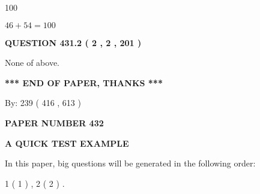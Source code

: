 \documentclass[12pt]{article}
\begin{document}
100
 
 
 
 
\noindent{}

$ %
46 +  %
54=   %
100$
 
 
  
\vspace{0.2in}
  
{\textbf{\Large{QUESTION
431.2 
 ( 2 , 2 , 201 )
}}}
  
  
 
 
\noindent{}
 
 
 None of above.
 
 
 
 
   
   
 \vspace{0.2in}
 
   
   
   
   
\vspace{1.0in} 
{\textbf{\large{ *** END OF PAPER, THANKS *** }}} 
   
   
\hspace{1.0in} By: 
 239 ( 416 ,  613 )
   
   
   
   
\newpage 
\setcounter{page}{ 
   432001 } 
   
   
   
   
 {\textbf{ \Large{ PAPER NUMBER  432  }}}
   
   
\vspace{0.2in}
   
   
   
   
   
   
 \vspace{0.2in}
{\LARGE {\textbf{ A QUICK TEST EXAMPLE}}}
   
   
   
\vspace{0.2in}
   
In this paper, big questions will be generated in the following order: 
   
   
   1 ( 1 )
 ,
   2 ( 2 )
 .
  
\vspace{0.2in}
  
\end{document}
